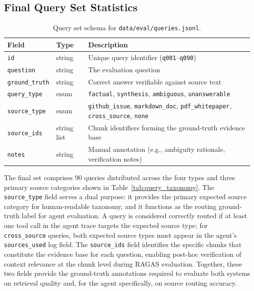 \subsection{Final Query Set Statistics}

\begin{table}[ht]
\centering
\small
\setlength{\tabcolsep}{4pt}
\caption{Query set schema for \texttt{data/eval/queries.jsonl}.}
\label{tab:query_schema}
\begin{tabular}{p{3.2cm}p{1.8cm}p{9.0cm}}
\hline
\textbf{Field} & \textbf{Type} & \textbf{Description} \\
\hline
\texttt{id}           & string       & Unique query identifier (\texttt{q001}--\texttt{q090}) \\
\texttt{question}     & string       & The evaluation question \\
\texttt{ground\_truth} & string      & Correct answer verifiable against source text \\
\texttt{query\_type}  & enum         & \texttt{factual}, \texttt{synthesis}, \texttt{ambiguous}, \texttt{unanswerable} \\
\texttt{source\_type} & enum         & \texttt{github\_issue}, \texttt{markdown\_doc}, \texttt{pdf\_whitepaper}, \texttt{cross\_source}, \texttt{none} \\
\texttt{source\_ids}  & string list  & Chunk identifiers forming the ground-truth evidence base \\
\texttt{notes}        & string       & Manual annotation (e.g., ambiguity rationale, verification notes) \\
\hline
\end{tabular}
\end{table}

The final set comprises 90 queries distributed across the four types and three primary source categories shown in Table~\ref{tab:query_taxonomy}. The \texttt{source\_type} field serves a dual purpose: it provides the primary expected source category for human-readable taxonomy, and it functions as the routing ground-truth label for agent evaluation. A query is considered correctly routed if at least one tool call in the agent trace targets the expected source type; for \texttt{cross\_source} queries, both expected source types must appear in the agent's \texttt{sources\_used} log field. The \texttt{source\_ids} field identifies the specific chunks that constitute the evidence base for each question, enabling post-hoc verification of context relevance at the chunk level during RAGAS evaluation. Together, these two fields provide the ground-truth annotations required to evaluate both systems on retrieval quality and, for the agent specifically, on source routing accuracy.

